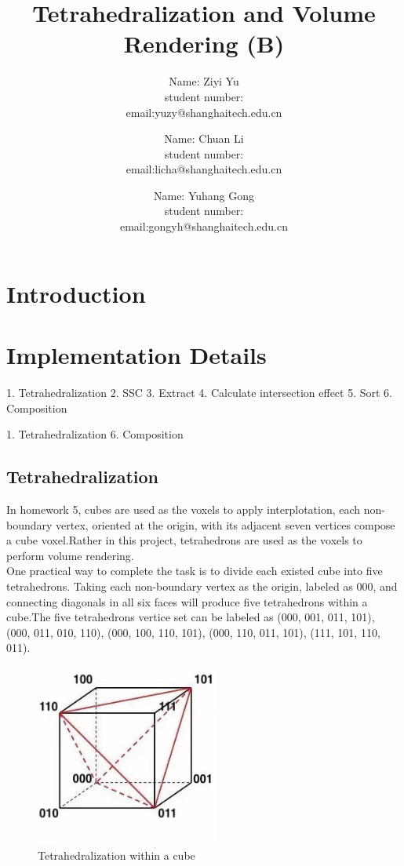 \documentclass[acmtog]{acmart}
\title{Tetrahedralization and Volume Rendering (B)}
\author{Name: Ziyi Yu   \\ student number:\quad 2018533124
	\\email:\quad yuzy@shanghaitech.edu.cn}
\author{Name: Chuan Li   \\ student number:\quad 123456789
	\\email:\quad licha@shanghaitech.edu.cn}
\author{Name: Yuhang Gong  \\ student number:\quad 2018533180
	\\email:\quad gongyh@shanghaitech.edu.cn}
\begin{document}
\maketitle

\vspace*{2 ex}


\section{Introduction}


\section{Implementation Details}
1. Tetrahedralization
2. SSC
3. Extract
4. Calculate intersection effect
5. Sort
6. Composition


1. Tetrahedralization
6. Composition

\subsection{Tetrahedralization}
In homework 5, cubes are used as the voxels to apply interplotation, 
each non-boundary vertex, oriented at the origin, with its adjacent seven vertices compose a cube voxel.Rather in this project, tetrahedrons are used as the voxels to perform volume rendering.
\\One practical way to complete the task is to divide each existed cube into five tetrahedrons.
Taking each non-boundary vertex as the origin, labeled as 000, and connecting diagonals in all six faces will produce five tetrahedrons within a cube.The five tetrahedrons vertice set can be labeled as
(000, 001, 011, 101), (000, 011, 010, 110), (000, 100, 110, 101), (000, 110, 011, 101), (111, 101, 110, 011).
\begin{figure}[h]
\centering
\includegraphics[width=6.00cm,height=6.00cm]{cube.jpg}
\caption{Tetrahedralization within a cube}
\end{figure}
\end{document}
